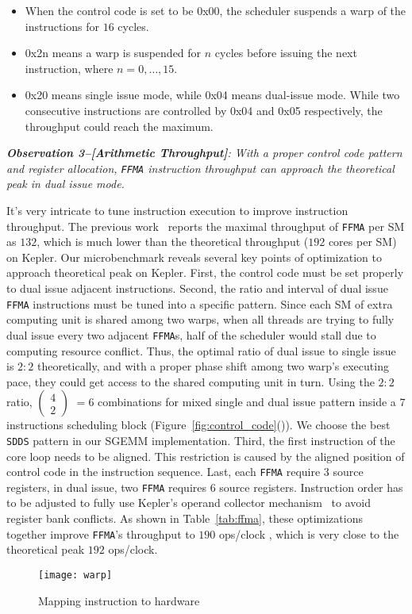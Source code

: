 \begin{itemize}
\item When the control code is set to be 0x00, the scheduler suspends a warp of the instructions for $16$ cycles.
\item 0x2n means a warp is suspended for $n$ cycles before issuing the next instruction, where $n=0, \dots, 15$.
\item 0x20 means single issue mode, while 0x04 means dual-issue mode.
While two consecutive instructions are controlled by 0x04 and 0x05 respectively, the throughput could reach the maximum.
\end{itemize}

{\em {\bf Observation 3--[Arithmetic Throughput]}:
With a proper control code pattern and register allocation, {\tt FFMA}
instruction throughput can approach the theoretical peak in dual issue mode.}

It's very intricate to tune instruction execution to improve instruction throughput. The previous work~\cite{lai}
reports the maximal throughput of {\tt FFMA} per SM as $132$, which is much lower than the theoretical throughput ($192$
cores per SM) on Kepler.
Our microbenchmark reveals several key points of optimization to approach theoretical peak on Kepler.
First, the control code must be set properly to dual issue adjacent instructions. Second, the ratio and interval of
dual issue {\tt FFMA} instructions must be tuned into a specific pattern.
Since each SM of extra computing unit is shared among two warps, when all threads are trying to fully dual issue every
two adjacent {\tt FFMA}s, half of the
scheduler would stall due to computing resource conflict.
Thus, the optimal ratio of dual issue to single issue is $2:2$ theoretically, and
with a proper phase shift among two warp's executing pace, they could get access to the shared computing unit in turn. %
Using the $2:2$ ratio, \( \begin{pmatrix} 4 \\ 2 \end{pmatrix} \) $=6$ combinations for mixed single  and dual issue pattern inside a $7$ instructions scheduling block (Figure~\ref{fig:control_code}()).
We choose the best {\tt SDDS} pattern in our SGEMM implementation.
Third, the first instruction of the core loop needs to be aligned. This restriction is
caused by the aligned position of control code in the instruction sequence.
Last, each {\tt FFMA} require $3$ source registers, in dual issue, two {\tt FFMA} requires $6$ source registers.  %
Instruction order has to be adjusted to fully use Kepler's operand collector mechanism~\cite{collector,tarjan2012policy}
to avoid register bank conflicts.
As shown in Table~\ref{tab:ffma}, these optimizations together improve {\tt FFMA}'s throughput to $190$ ops/clock
, which is very close to the theoretical peak $192$ ops/clock.
\begin{figure}[htbp]
\begin{center}
\texttt{[image: warp]}
    \caption{Mapping instruction to hardware}
\label{fig:warp}
\end{center}
\end{figure}

